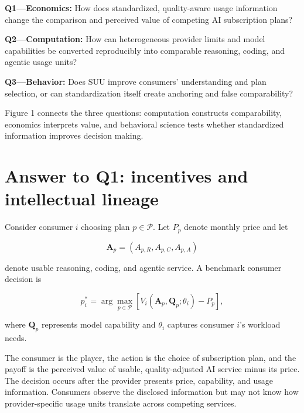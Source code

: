 \documentclass[sigconf,nonacm]{acmart}
\begin{document}
\vspace{0.5em}

\textbf{Q1---Economics:}
How does standardized, quality-aware usage information change the comparison
and perceived value of competing AI subscription plans?

\vspace{0.35em}

\textbf{Q2---Computation:}
How can heterogeneous provider limits and model capabilities be converted
reproducibly into comparable reasoning, coding, and agentic usage units?

\vspace{0.35em}

\textbf{Q3---Behavior:}
Does SUU improve consumers' understanding and plan selection, or can
standardization itself create anchoring and false comparability?

\vspace{0.5em}

Figure 1 connects the three questions:
computation constructs comparability,
economics interprets value,
and behavioral science tests whether standardized information improves
decision making.



\section{Answer to Q1: incentives and intellectual lineage}

Consider consumer $i$ choosing plan $p\in\mathcal{P}$.
Let $P_p$ denote monthly price and let

\[
\mathbf{A}_p
=
(A_{p,R},A_{p,C},A_{p,A})
\]

denote usable reasoning, coding, and agentic service.
A benchmark consumer decision is

\[
p_i^*
=
\arg\max_{p\in\mathcal P}
\left[
V_i(\mathbf{A}_p,\mathbf{Q}_p;\theta_i)
-
P_p
\right],
\]

where $\mathbf{Q}_p$ represents model capability and
$\theta_i$ captures consumer $i$'s workload needs.

\vspace{0.5em}

The consumer is the player, the action is the choice of subscription plan,
and the payoff is the perceived value of usable, quality-adjusted AI service
minus its price. The decision occurs after the provider presents price,
capability, and usage information. Consumers observe the disclosed information
but may not know how provider-specific usage units translate across competing
services.
\end{document}
